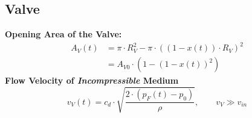 \subsection{Valve}
    \vspace{-1em}
    \begin{center}
    \end{center}
    \textbf{Opening Area of the Valve:}
    \begin{align*}
        A_V(t) &= \pi \cdot R_V^2 - \pi \cdot \left( (1-x(t)) \cdot R_V\right)^2\\
        &= A_{V0} \cdot \left( 1 - (1-x(t))^2 \right)
    \end{align*}
    \textbf{Flow Velocity of \textit{Incompressible} Medium}
    $$
        v_V(t) = c_d \cdot \sqrt{\frac{2 \cdot (p_F(t) - p_0)}{\rho}}, \qquad v_V \gg v_{in}
    $$
        